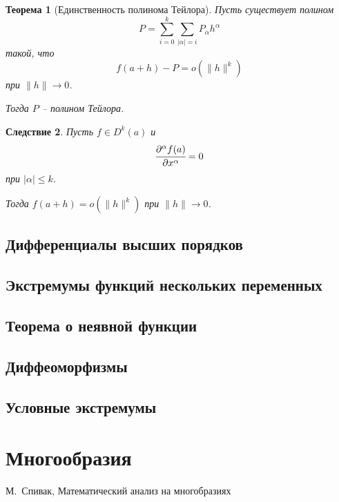 \documentclass[oneside, final]{book}
\theoremstyle{plain}
\newtheorem{theorem}{Теорема}[chapter]
\newtheorem{corollary}[theorem]{Следствие}
\theoremstyle{definition}
\begin{document}
	\begin{theorem}[Единственность полинома Тейлора]
		Пусть существует полином 
		$$
			P = \sum \limits_{i=0}^k \sum\limits_{|\alpha|=i} P_\alpha h^\alpha
		$$
		такой, что 
		$$
			f(a+h) - P = o(\|h\|^k)
		$$ при $\|h\|\to 0$.
		
		Тогда $P$ -- полином Тейлора.
	\end{theorem}
	
	\begin{corollary}
		Пусть $f\in D^k(a)$ и $$\cfrac {\partial^\alpha f(a)} {\partial x^\alpha} = 0$$ при $|\alpha| \le k$.
		
		Тогда $f(a+h) = o(\|h\|^k)$ при $\|h\|\to0$.
	\end{corollary}
	
	\section{Дифференциалы высших порядков}
	
	\section{Экстремумы функций нескольких переменных}
	
	\section{Теорема о неявной функции}
	
	\section{Диффеоморфизмы}
	
	\section{Условные экстремумы} 
		
	\chapter{Многообразия}
	
	\begin{thebibliography}{0}
		 М.~Спивак, Математический анализ на многобразиях
	\end{thebibliography}
\end{document}

